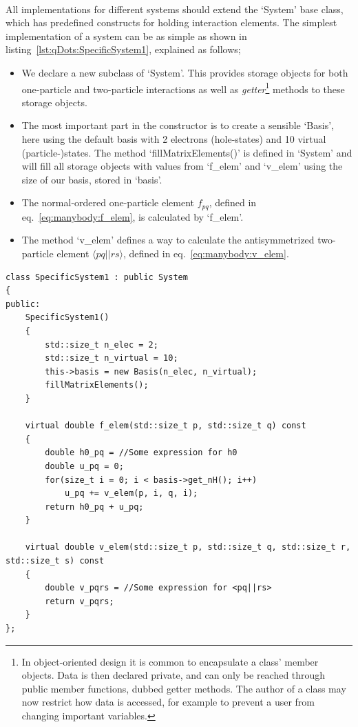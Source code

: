 \paragraph{}
All implementations for different systems should extend the `System' base class, which has predefined constructs for holding interaction elements.
The simplest implementation of a system can be as simple as shown in listing~\ref{lst:qDots:SpecificSystem1}, explained as follows;
\begin{itemize}
\item[Line 1:~] We declare a new subclass of `System'. This provides storage objects for both one-particle and two-particle interactions as well as \textit{getter}\footnote{In object-oriented design it is common to encapsulate a class' member objects. Data is then declared private, and can only be reached through public member functions, dubbed getter methods. The author of a class may now restrict how data is accessed, for example to prevent a user from changing important variables.} methods to these storage objects.
\item[Line 4:~] The most important part in the constructor is to create a sensible `Basis', here using the default basis with 2 electrons (hole-states) and 10 virtual (particle-)states. The method `fillMatrixElements()' is defined in `System' and will fill all storage objects with values from `f\_elem' and `v\_elem' using the size of our basis, stored in `basis'.
\item[Line 12:] The normal-ordered one-particle element $f_{pq}$, defined in eq.~\eqref{eq:manybody:f_elem}, is calculated by `f\_elem'. 
\item[Line 21:] The method `v\_elem' defines a way to calculate the antisymmetrized two-particle element $\langle pq || rs \rangle $, defined in eq.~\eqref{eq:manybody:v_elem}.
\end{itemize}
\begin{lstlisting}[float,label={lst:qDots:SpecificSystem1},caption={Example on how to implement a specific system by extending the `System' super class.}]
class SpecificSystem1 : public System
{
public:
	SpecificSystem1()
	{
		std::size_t n_elec = 2;
		std::size_t n_virtual = 10;
		this->basis = new Basis(n_elec, n_virtual);
		fillMatrixElements();
	}
	
	virtual double f_elem(std::size_t p, std::size_t q) const
	{
		double h0_pq = //Some expression for h0
		double u_pq = 0;
		for(size_t i = 0; i < basis->get_nH(); i++)
			u_pq += v_elem(p, i, q, i);
		return h0_pq + u_pq;
	}
	
	virtual double v_elem(std::size_t p, std::size_t q, std::size_t r, std::size_t s) const
	{
		double v_pqrs = //Some expression for <pq||rs>
		return v_pqrs;
	}
};
\end{lstlisting}

